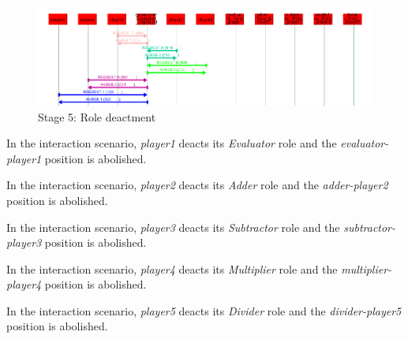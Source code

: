 \begin{figure}[H]
	\centering
	\includegraphics[width=\textwidth]{images/examples/example2-stage5}
	\caption{Stage 5: Role deactment}
	\label{figure:example2-stage5}
\end{figure} 

In the {} interaction scenario, \textit{player1} deacts its \textit{Evaluator} role and the \textit{evaluator-player1} position is abolished.

In the {} interaction scenario, \textit{player2} deacts its \textit{Adder} role and the \textit{adder-player2} position is abolished.

In the {} interaction scenario, \textit{player3} deacts its \textit{Subtractor} role and the \textit{subtractor-player3} position is abolished.

In the {} interaction scenario, \textit{player4} deacts its \textit{Multiplier} role and the \textit{multiplier-player4} position is abolished.

In the {} interaction scenario, \textit{player5} deacts its \textit{Divider} role and the \textit{divider-player5} position is abolished.